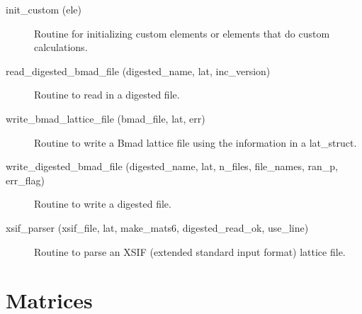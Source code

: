 \begin{description}
\label{r:init.custom}
\item[init_custom (ele)] \Newline
Routine for initializing custom elements or elements that do custom
calculations.

\label{r:read.digested.bmad.file}
\item[read_digested_bmad_file (digested_name, lat, inc_version)] \Newline
Routine to read in a digested file. 

\label{r:write.bmad.lattice.file}
\item[write_bmad_lattice_file (bmad_file, lat, err)] \Newline 
Routine to write a Bmad lattice file using the information in
a lat_struct.

\label{r:write.digested.bmad.file}
\item[write_digested_bmad_file (digested_name, lat, n_files, file_names, ran_p, err_flag)] \Newline
Routine to write a digested file. 

\label{r:xsif.parser}
\item[xsif_parser (xsif_file, lat, make_mats6, digested_read_ok, use_line)] \Newline 
     Routine to parse an XSIF (extended standard input format) lattice file.

\end{description}

\section{Matrices}
\label{r:mat}

